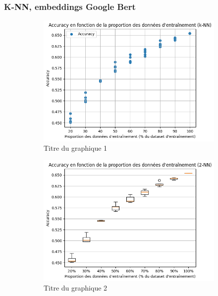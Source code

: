 \documentclass[12pt]{article}
\begin{document}
\subsubsection{K-NN, embeddings Google Bert}
\begin{figure}[H]
    \centering
    \begin{subfigure}[t]{0.49\textwidth}
        \centering
        \includegraphics[width=\textwidth]{static/knn_goo_2_raw.png} 
        \caption{Titre du graphique 1}
    \end{subfigure}
    \hfill
    \begin{subfigure}[t]{0.49\textwidth}
        \centering
        \includegraphics[width=\textwidth]{static/knn_goo_2.png}
        \caption{Titre du graphique 2}
    \end{subfigure}
    \hfill
    \begin{subfigure}[t]{0.35\textwidth}

\end{subfigure}
\end{figure}
\end{document}
